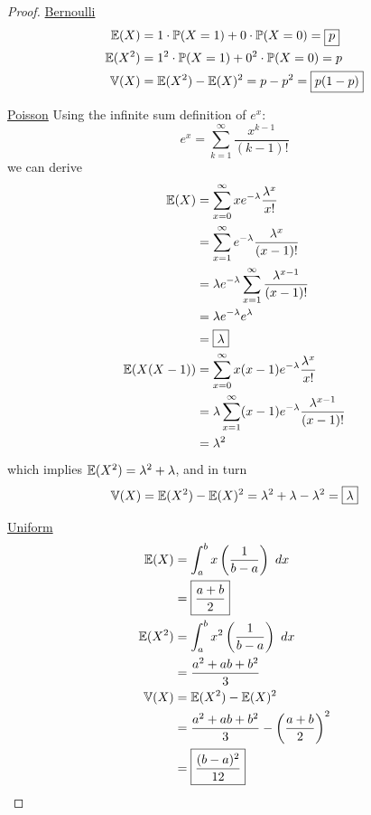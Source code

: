 \documentclass[a4paper]{article}
\begin{document}
\newpage
\begin{proof}[Proof] 
\underline{Bernoulli}
\begin{align*}
	\mathbb{E}(X) & = 1 \cdot \mathbb{P}(X = 1) + 0 \cdot \mathbb{P}(X = 0) = \boxed{p} \\
	\mathbb{E}(X^{2}) & = 1^{2} \cdot \mathbb{P}(X = 1) + 0^{2} \cdot \mathbb{P}(X = 0) = p \\ 
	\mathbb{V}(X) & = \mathbb{E}(X^{2}) - \mathbb{E}(X)^{2} = p - p^{2} = \boxed{p(1-p)}
\end{align*}

\underline{Poisson}
Using the infinite sum definition of \(e^{x}\):
\[
	e^{x} = \sum_{k=1}^{\infty} \frac{x^{k-1}}{(k-1)!}
\]
we can derive
\begin{align*}
	\mathbb{E}(X) & = \sum_{x=0}^{\infty} xe^{-\lambda } \frac{\lambda^{x}}{x!} \\
	 & = \sum_{x=1}^{\infty} e^{-\lambda } \frac{\lambda^{x}}{(x-1)!} \\ 
	 & = \lambda e^{-\lambda } \sum_{x=1}^{\infty} \frac{\lambda^{x-1}}{(x-1)!} \\
	 & = \lambda e^{-\lambda }e^{\lambda } \\
	 & = \boxed{\lambda } \\
	\mathbb{E}(X(X-1)) & = \sum_{x=0}^{\infty} x(x-1) e^{-\lambda } \frac{\lambda^{x}}{x!} \\
	 & = \lambda \sum_{x=1}^{\infty} (x-1) e^{-\lambda } \frac{\lambda^{x-1}}{(x-1)!} \\
	 & = \lambda^{2}
\end{align*}
which implies \(\mathbb{E}(X^{2}) = \lambda^{2} + \lambda \), and in turn
\[
	\mathbb{V}(X) = \mathbb{E}(X^{2}) - \mathbb{E}(X)^{2} = \lambda^{2} + \lambda - \lambda^{2} = \boxed{\lambda }
\]

\underline{Uniform}
\begin{align*}
	\E(X) & = \int^{b}_{a} x \left( \frac{1}{b-a} \right)  \ dx  \\
	      & = \boxed{\frac{a + b}{2}} \\
	\E(X^{2}) & = \int^{b}_{a} x^{2} \left( \frac{1}{b-a} \right)  \ dx \\
	      & = \frac{a^{2} + ab + b^{2}}{3} \\
	\var(X) & = \E(X^{2}) - \E(X)^{2} \\
	      & = \frac{a^{2} + ab+ b^{2}}{3} - \left( \frac{a+b}{2} \right)^{2} \\
	      & = \boxed{\frac{(b-a)^{2}}{12}}
\end{align*}


\end{proof}
\end{document}
